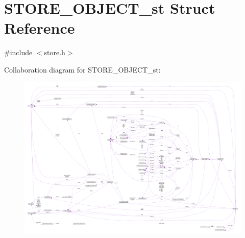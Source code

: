 \hypertarget{struct_s_t_o_r_e___o_b_j_e_c_t__st}{}\section{S\+T\+O\+R\+E\+\_\+\+O\+B\+J\+E\+C\+T\+\_\+st Struct Reference}
\label{struct_s_t_o_r_e___o_b_j_e_c_t__st}


{\ttfamily \#include $<$store.\+h$>$}



Collaboration diagram for S\+T\+O\+R\+E\+\_\+\+O\+B\+J\+E\+C\+T\+\_\+st\+:\nopagebreak
\begin{figure}[H]
\begin{center}
\leavevmode
\includegraphics[width=350pt]{struct_s_t_o_r_e___o_b_j_e_c_t__st__coll__graph}
\end{center}
\end{figure}
